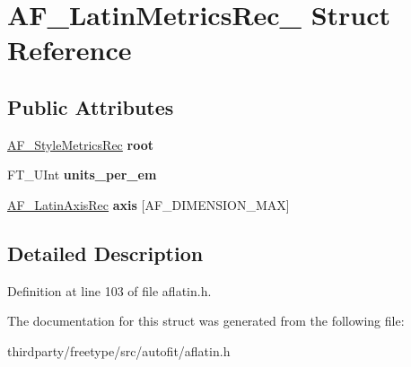 \hypertarget{struct_a_f___latin_metrics_rec__}{}\section{A\+F\+\_\+\+Latin\+Metrics\+Rec\+\_\+ Struct Reference}
\label{struct_a_f___latin_metrics_rec__}
\subsection*{Public Attributes}
\begin{DoxyCompactItemize}
\item 
\mbox{\label{struct_a_f___latin_metrics_rec___a139afc73e5f0e6c90d6865a848e16f42}} 
\hyperlink{struct_a_f___style_metrics_rec__}{A\+F\+\_\+\+Style\+Metrics\+Rec} {\bfseries root}
\item 
\mbox{\label{struct_a_f___latin_metrics_rec___adde47f3bb5791425e08f5c3b8680d731}} 
F\+T\+\_\+\+U\+Int {\bfseries units\+\_\+per\+\_\+em}
\item 
\mbox{\label{struct_a_f___latin_metrics_rec___af1bc992e9c29a875d1f3ad1fe1b48ba3}} 
\hyperlink{struct_a_f___latin_axis_rec__}{A\+F\+\_\+\+Latin\+Axis\+Rec} {\bfseries axis} \mbox{[}A\+F\+\_\+\+D\+I\+M\+E\+N\+S\+I\+O\+N\+\_\+\+M\+AX\mbox{]}
\end{DoxyCompactItemize}


\subsection{Detailed Description}


Definition at line 103 of file aflatin.\+h.



The documentation for this struct was generated from the following file\+:\begin{DoxyCompactItemize}
\item 
thirdparty/freetype/src/autofit/aflatin.\+h\end{DoxyCompactItemize}
